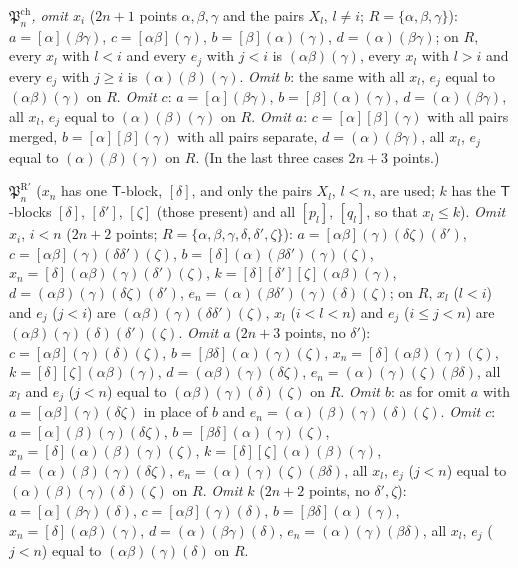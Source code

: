 \documentclass[11pt]{amsart}
\theoremstyle{definition}
\newcommand{\T}{\mathsf{T}}
\begin{document}
\smallskip
\emph{$\mathfrak P^{\mathrm{ch}}_n$, omit $x_i$} ($2n+1$ points $\alpha,\beta,\gamma$ and the pairs $X_l$, $l\ne i$; $R=\{\alpha,\beta,\gamma\}$): $a=[\alpha](\beta\gamma)$, $c=[\alpha\beta](\gamma)$, $b=[\beta](\alpha)(\gamma)$, $d=(\alpha)(\beta\gamma)$; on $R$, every $x_l$ with $l<i$ and every $e_j$ with $j<i$ is $(\alpha\beta)(\gamma)$, every $x_l$ with $l>i$ and every $e_j$ with $j\ge i$ is $(\alpha)(\beta)(\gamma)$. \emph{Omit $b$}: the same with all $x_l$, $e_j$ equal to $(\alpha\beta)(\gamma)$ on $R$. \emph{Omit $c$}: $a=[\alpha](\beta\gamma)$, $b=[\beta](\alpha)(\gamma)$, $d=(\alpha)(\beta\gamma)$, all $x_l$, $e_j$ equal to $(\alpha)(\beta)(\gamma)$ on $R$. \emph{Omit $a$}: $c=[\alpha][\beta](\gamma)$ with all pairs merged, $b=[\alpha][\beta](\gamma)$ with all pairs separate, $d=(\alpha)(\beta\gamma)$, all $x_l$, $e_j$ equal to $(\alpha)(\beta)(\gamma)$ on $R$. (In the last three cases $2n+3$ points.)

\smallskip
\emph{$\mathfrak P^{\mathrm R'}_n$} ($x_n$ has one $\T$-block, $[\delta]$, and only the pairs $X_l$, $l<n$, are used; $k$ has the $\T$-blocks $[\delta]$, $[\delta']$, $[\zeta]$ (those present) and all $[p_l]$, $[q_l]$, so that $x_l\le k$). \emph{Omit $x_i$}, $i<n$ ($2n+2$ points; $R=\{\alpha,\beta,\gamma,\delta,\delta',\zeta\}$): $a=[\alpha\beta](\gamma)(\delta\zeta)(\delta')$, $c=[\alpha\beta](\gamma)(\delta\delta')(\zeta)$, $b=[\delta](\alpha)(\beta\delta')(\gamma)(\zeta)$, $x_n=[\delta](\alpha\beta)(\gamma)(\delta')(\zeta)$, $k=[\delta][\delta'][\zeta](\alpha\beta)(\gamma)$, $d=(\alpha\beta)(\gamma)(\delta\zeta)(\delta')$, $e_n=(\alpha)(\beta\delta')(\gamma)(\delta)(\zeta)$; on $R$, $x_l$ ($l<i$) and $e_j$ ($j<i$) are $(\alpha\beta)(\gamma)(\delta\delta')(\zeta)$, $x_l$ ($i<l<n$) and $e_j$ ($i\le j<n$) are $(\alpha\beta)(\gamma)(\delta)(\delta')(\zeta)$. \emph{Omit $a$} ($2n+3$ points, no $\delta'$): $c=[\alpha\beta](\gamma)(\delta)(\zeta)$, $b=[\beta\delta](\alpha)(\gamma)(\zeta)$, $x_n=[\delta](\alpha\beta)(\gamma)(\zeta)$, $k=[\delta][\zeta](\alpha\beta)(\gamma)$, $d=(\alpha\beta)(\gamma)(\delta\zeta)$, $e_n=(\alpha)(\gamma)(\zeta)(\beta\delta)$, all $x_l$ and $e_j$ ($j<n$) equal to $(\alpha\beta)(\gamma)(\delta)(\zeta)$ on $R$. \emph{Omit $b$}: as for omit $a$ with $a=[\alpha\beta](\gamma)(\delta\zeta)$ in place of $b$ and $e_n=(\alpha)(\beta)(\gamma)(\delta)(\zeta)$. \emph{Omit $c$}: $a=[\alpha](\beta)(\gamma)(\delta\zeta)$, $b=[\beta\delta](\alpha)(\gamma)(\zeta)$, $x_n=[\delta](\alpha)(\beta)(\gamma)(\zeta)$, $k=[\delta][\zeta](\alpha)(\beta)(\gamma)$, $d=(\alpha)(\beta)(\gamma)(\delta\zeta)$, $e_n=(\alpha)(\gamma)(\zeta)(\beta\delta)$, all $x_l$, $e_j$ ($j<n$) equal to $(\alpha)(\beta)(\gamma)(\delta)(\zeta)$ on $R$. \emph{Omit $k$} ($2n+2$ points, no $\delta',\zeta$): $a=[\alpha](\beta\gamma)(\delta)$, $c=[\alpha\beta](\gamma)(\delta)$, $b=[\beta\delta](\alpha)(\gamma)$, $x_n=[\delta](\alpha\beta)(\gamma)$, $d=(\alpha)(\beta\gamma)(\delta)$, $e_n=(\alpha)(\gamma)(\beta\delta)$, all $x_l$, $e_j$ ($j<n$) equal to $(\alpha\beta)(\gamma)(\delta)$ on $R$.
\end{document}
